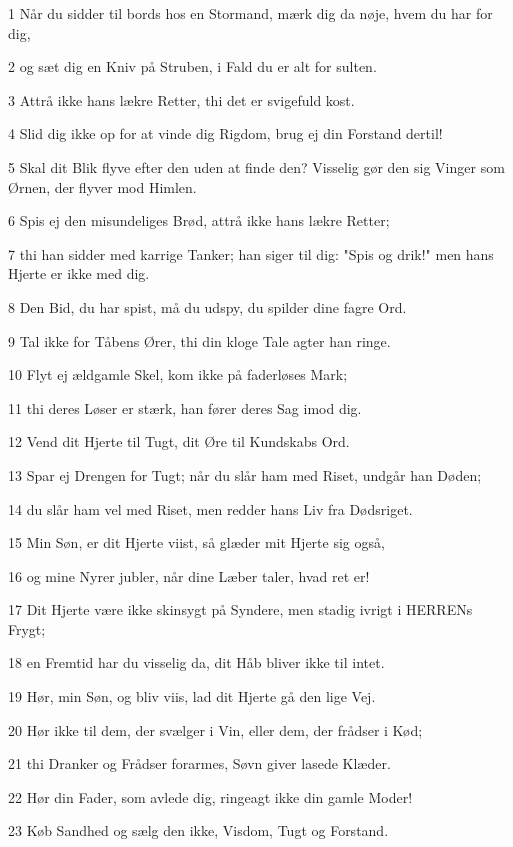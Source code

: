 \par 1 Når du sidder til bords hos en Stormand, mærk dig da nøje, hvem du har for dig,
\par 2 og sæt dig en Kniv på Struben, i Fald du er alt for sulten.
\par 3 Attrå ikke hans lækre Retter, thi det er svigefuld kost.
\par 4 Slid dig ikke op for at vinde dig Rigdom, brug ej din Forstand dertil!
\par 5 Skal dit Blik flyve efter den uden at finde den? Visselig gør den sig Vinger som Ørnen, der flyver mod Himlen.
\par 6 Spis ej den misundeliges Brød, attrå ikke hans lækre Retter;
\par 7 thi han sidder med karrige Tanker; han siger til dig: "Spis og drik!" men hans Hjerte er ikke med dig.
\par 8 Den Bid, du har spist, må du udspy, du spilder dine fagre Ord.
\par 9 Tal ikke for Tåbens Ører, thi din kloge Tale agter han ringe.
\par 10 Flyt ej ældgamle Skel, kom ikke på faderløses Mark;
\par 11 thi deres Løser er stærk, han fører deres Sag imod dig.
\par 12 Vend dit Hjerte til Tugt, dit Øre til Kundskabs Ord.
\par 13 Spar ej Drengen for Tugt; når du slår ham med Riset, undgår han Døden;
\par 14 du slår ham vel med Riset, men redder hans Liv fra Dødsriget.
\par 15 Min Søn, er dit Hjerte viist, så glæder mit Hjerte sig også,
\par 16 og mine Nyrer jubler, når dine Læber taler, hvad ret er!
\par 17 Dit Hjerte være ikke skinsygt på Syndere, men stadig ivrigt i HERRENs Frygt;
\par 18 en Fremtid har du visselig da, dit Håb bliver ikke til intet.
\par 19 Hør, min Søn, og bliv viis, lad dit Hjerte gå den lige Vej.
\par 20 Hør ikke til dem, der svælger i Vin, eller dem, der frådser i Kød;
\par 21 thi Dranker og Frådser forarmes, Søvn giver lasede Klæder.
\par 22 Hør din Fader, som avlede dig, ringeagt ikke din gamle Moder!
\par 23 Køb Sandhed og sælg den ikke, Visdom, Tugt og Forstand.
